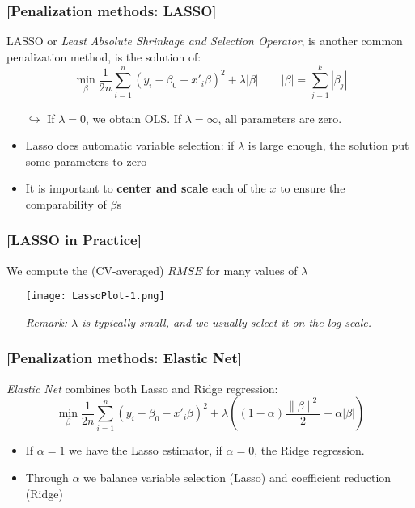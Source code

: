 \documentclass[xcolor=x11names,compress, aspectratio=169]{beamer}
\renewcommand{\(}{\begin{columns}}
\renewcommand{\)}{\end{columns}}
\newcommand{\<}[1]{\begin{column}{#1}}
\renewcommand{\>}{\end{column}}
\begin{document}
\begin{frame} %
\frametitle{\textcolor{brique}{[Penalization methods: LASSO]}}
LASSO or \textit{Least Absolute Shrinkage and Selection Operator}, is another common penalization method,
 is  the solution of:
$$
\min_{\beta} \frac{1}{2n}
\sum_{i=1}^{n}{ \left( y_i - \beta_0 - x'_i\beta\right)^{2} } +
\lambda |\beta|
\qquad
|\beta| = \sum_{j=1}^k |\beta_j|
$$
\pause
\begin{itemize}[<+->]
\item[$\hookrightarrow$] If $\lambda  = 0$, we obtain OLS. If $\lambda = \infty$, all
  parameters are zero.
\item Lasso does automatic variable selection: if $\lambda$ is large enough, the solution put some parameters to zero
\item It is important to \textbf{center and scale}  each of the $x$ to ensure the comparability of $\beta$s
\end{itemize}
\end{frame}

\begin{frame} %
\frametitle{\textcolor{brique}{[LASSO in Practice]}}
We compute the (CV-averaged) $RMSE$ for many values of $\lambda$
\pause
\begin{itemize}[<+->]
\item[]  \texttt{[image: LassoPlot-1.png]}
\item[]\textit{Remark: $\lambda$ is typically small, and we usually select it on the log scale.}
\end{itemize}
\end{frame}


\begin{frame} %
\frametitle{\textcolor{brique}{[Penalization methods: Elastic Net]}}
\textit{Elastic Net} combines both Lasso and Ridge regression:
$$
\min_{\beta} \frac{1}{2n}
\sum_{i=1}^{n}{ \left( y_i - \beta_0 - x'_i\beta\right)^{2} } +
\lambda \left( (1-\alpha) \frac{ \|\beta\|^2}{2}  + \alpha |\beta| \right)
$$
\pause
\begin{itemize}[<+->]
\item If $\alpha=1$ we have the Lasso estimator, if  $\alpha=0$,  the Ridge regression.
\item Through $\alpha$ we balance variable selection (Lasso) and coefficient reduction (Ridge)
\end{itemize}
\end{frame}
\end{document}
